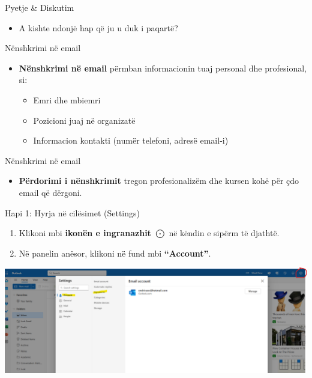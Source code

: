 \documentclass[
  ignorenonframetext,
]{beamer}
\providecommand{\tightlist}{%
  \setlength{\itemsep}{0pt}\setlength{\parskip}{0pt}}
\begin{document}
\begin{frame}{Pyetje \& Diskutim}
\label{pyetje-diskutim-1}
\begin{itemize}
\tightlist
\item
  A kishte ndonjë hap që ju u duk i paqartë?
\end{itemize}
\end{frame}

\begin{frame}{Nënshkrimi në email}
\label{nuxebnshkrimi-nuxeb-email}
\begin{itemize}
\item
  \textbf{Nënshkrimi në email} përmban informacionin tuaj personal dhe
  profesional, si:

  \begin{itemize}
  \item
    Emri dhe mbiemri
  \item
    Pozicioni juaj në organizatë
  \item
    Informacion kontakti (numër telefoni, adresë email-i)
  \end{itemize}
\end{itemize}
\end{frame}

\begin{frame}{Nënshkrimi në email}
\label{nuxebnshkrimi-nuxeb-email-1}
\begin{itemize}
\tightlist
\item
  \textbf{Përdorimi i nënshkrimit} tregon profesionalizëm dhe kursen
  kohë për çdo email që dërgoni.
\end{itemize}
\end{frame}

\begin{frame}{Hapi 1: Hyrja në cilësimet (Settings)}
\label{hapi-1-hyrja-nuxeb-ciluxebsimet-settings}
\begin{enumerate}
\item
  Klikoni mbi \textbf{ikonën e ingranazhit} \(\bigodot\) në këndin e
  sipërm të djathtë.
\item
  Në panelin anësor, klikoni në fund mbi \textbf{``Account''}.
\end{enumerate}

\includegraphics{./images/outlook7.png}
\end{frame}
\end{document}
